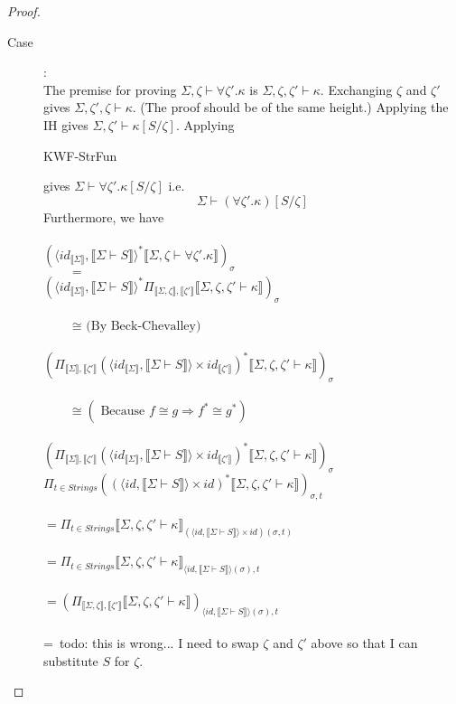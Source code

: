\documentclass{article}
\newcommand{\sem}[1]{\llbracket #1 \rrbracket}
\begin{document}
\begin{proof}
\begin{description}
\item[Case ]:~\\
The premise for proving $\Sigma,\zeta \vdash \forall \zeta'.\kappa$ is $\Sigma,\zeta,\zeta' \vdash \kappa$. Exchanging $\zeta$ and $\zeta'$ gives $\Sigma,\zeta',\zeta \vdash \kappa$. (The proof should be of the same height.) Applying the IH gives $\Sigma,\zeta' \vdash \kappa[S/\zeta]$. Applying \begin{sc}KWF-StrFun\end{sc} gives $\Sigma \vdash \forall \zeta'. \kappa[S/\zeta]$ i.e.
$$\Sigma \vdash (\forall \zeta'. \kappa)[S/\zeta]$$
Furthermore, we have\\~\\
$(\langle \mathit{id}_{\sem{\Sigma}}, \sem{\Sigma \vdash S} \rangle^* \sem{\Sigma,\zeta \vdash \forall \zeta'. \kappa})_\sigma$\\
$~~~~~~~~~=$\\
$(\langle \mathit{id}_{\sem{\Sigma}}, \sem{\Sigma \vdash S} \rangle^* \Pi_{\sem{\Sigma,\zeta},\sem{\zeta'}} \sem{\Sigma,\zeta,\zeta' \vdash \kappa})_\sigma$\\~\\
$~~~~~~~~~\cong \text{ (By Beck-Chevalley)}$\\~\\
$(\Pi_{\sem{\Sigma},\sem{\zeta'}} (\langle \mathit{id}_{\sem{\Sigma}}, \sem{\Sigma \vdash S} \rangle \times \mathit{id}_{\sem{\zeta'}})^* \sem{\Sigma, \zeta, \zeta' \vdash \kappa})_\sigma$\\~\\
$~~~~~~~~~\cong (\text{ Because }f \cong g \Rightarrow f^* \cong g^*)$\\~\\
$(\Pi_{\sem{\Sigma},\sem{\zeta'}} (\langle \mathit{id}_{\sem{\Sigma}}, \sem{\Sigma \vdash S} \rangle \times \mathit{id}_{\sem{\zeta'}})^* \sem{\Sigma, \zeta, \zeta' \vdash \kappa})_\sigma$
$\Pi_{t \in \mathit{Strings}} ((\langle \mathit{id}, \sem{\Sigma \vdash S} \rangle \times \mathit{id})^* \sem{\Sigma,\zeta,\zeta' \vdash \kappa})_{\sigma, t} $\\~\\
$= \Pi_{t \in \mathit{Strings}} \sem{\Sigma,\zeta,\zeta' \vdash \kappa}_{(\langle \mathit{id}, \sem{\Sigma \vdash S} \rangle \times \mathit{id} )(\sigma, t)}$\\~\\
$= \Pi_{t \in \mathit{Strings}} \sem{\Sigma,\zeta,\zeta' \vdash \kappa}_{\langle \mathit{id}, \sem{\Sigma \vdash S} \rangle(\sigma),t}$\\~\\
$= (\Pi_{\sem{\Sigma,\zeta},\sem{\zeta'}} \sem{\Sigma,\zeta,\zeta' \vdash \kappa} )_{\langle \mathit{id}, \sem{\Sigma \vdash S} \rangle(\sigma),t}$\\~\\
=~todo: this is wrong... I need to swap $\zeta$ and $\zeta'$ above so that I can substitute $S$ for $\zeta$.

\end{description}
\end{proof}
\end{document}
